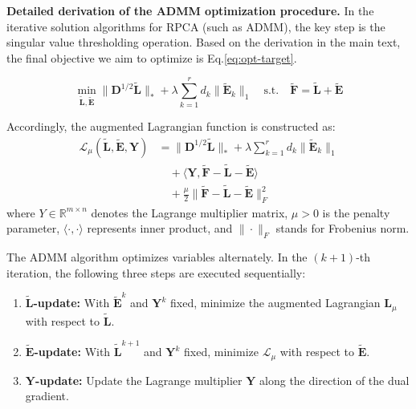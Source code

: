 \noindent\textbf{Detailed derivation of the ADMM optimization procedure.} 
In the iterative solution algorithms for RPCA (such as ADMM), the key step is the singular value thresholding operation. Based on the derivation in the main text, the final objective we aim to optimize is Eq.\eqref{eq:opt-target}.

\begin{equation}
    \min_{\tilde{\mathbf{L}}, \tilde{\mathbf{E}}} \|\mathbf{D}^{1/2} \tilde{\mathbf{L}}\|_* + \lambda \sum_{k=1}^r d_k \|\tilde{\mathbf{E}}_{k}\|_1 \quad \text{s.t.} \quad \tilde{\mathbf{F}} = \tilde{\mathbf{L}} + \tilde{\mathbf{E}}
    \label{eq:opt-target}
\end{equation}

Accordingly, the augmented Lagrangian function is constructed as:
\begin{equation}
\begin{aligned} \mathcal{L}_{\mu}(\tilde{\mathbf{L}}, \tilde{\mathbf{E}}, \mathbf{Y}) &= \|\mathbf{D}^{1/2} \tilde{\mathbf{L}}\|_* + \lambda \sum_{k=1}^{r} d_k \|\tilde{\mathbf{E}}_{k}\|_1 \\ &\quad + \langle \mathbf{Y}, \tilde{\mathbf{F}} - \tilde{\mathbf{L}} - \tilde{\mathbf{E}} \rangle \\ &\quad + \frac{\mu}{2} \|\tilde{\mathbf{F}} - \tilde{\mathbf{L}} - \tilde{\mathbf{E}}\|_F^2 \end{aligned}
\end{equation}
where $Y \in \mathbb{R}^{m \times n}$ denotes the Lagrange multiplier matrix, $\mu > 0$ is the penalty parameter, $\langle \cdot, \cdot \rangle$ represents inner product, and  $\|\cdot\|_F$ stands for Frobenius norm.

The ADMM algorithm optimizes variables alternately. In the $(k+1)$-th iteration, the following three steps are executed sequentially:
\begin{enumerate}
    \item \textbf{$\tilde{\mathbf{L}}$-update:} With $\tilde{\mathbf{{E}}}^k$ and $\mathbf{Y}^k$ fixed, minimize the augmented Lagrangian $\mathcal{\mathbf{L}}_\mu$ with respect to $\tilde{\mathbf{L}}$.
    
    \item \textbf{$\tilde{\mathbf{E}}$-update:} With $\tilde{\mathbf{L}}^{k+1}$ and $\mathbf{Y}^k$ fixed, minimize $\mathcal{L}_\mu$ with respect to $\tilde{\mathbf{E}}$.
    
    \item \textbf{$\mathbf{Y}$-update:} Update the Lagrange multiplier $\mathbf{Y}$ along the direction of the dual gradient.
\end{enumerate}

